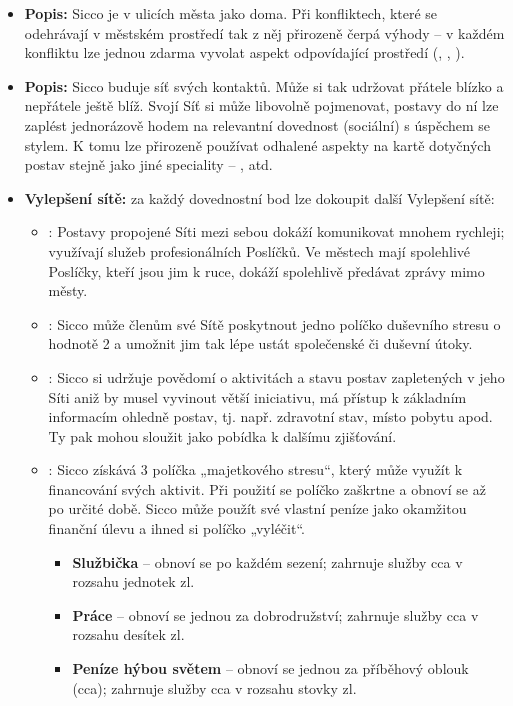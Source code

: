 \documentclass[../main.tex]{subfiles}
\begin{document}
\begin{specialita}
\begin{itemize}
	\item \textbf{Popis:} Sicco je v ulicích města jako doma. Při konfliktech, které se odehrávají v městském prostředí tak z něj přirozeně čerpá výhody – v každém konfliktu lze jednou zdarma vyvolat aspekt odpovídající prostředí (, , ).
\end{itemize}
\end{specialita}

\begin{specialita}
\begin{itemize}
	\item \textbf{Popis:} Sicco buduje síť svých kontaktů. Může si tak udržovat přátele blízko a nepřátele ještě blíž. Svojí Síť si může libovolně pojmenovat, postavy do ní lze zaplést jednorázově hodem na relevantní dovednost (sociální) s úspěchem se stylem. K tomu lze přirozeně používat odhalené aspekty na kartě dotyčných postav stejně jako jiné speciality – ,  atd.
	\item \textbf{Vylepšení sítě:} za každý dovednostní bod lze dokoupit další Vylepšení sítě:
		\begin{itemize}
			\item {}: Postavy propojené Síti mezi sebou dokáží komunikovat mnohem rychleji; využívají služeb profesionálních Poslíčků. Ve městech mají spolehlivé Poslíčky, kteří jsou jim k ruce, dokáží spolehlivě předávat zprávy mimo městy.
			\item {}: Sicco může členům své Sítě poskytnout jedno políčko duševního stresu o hodnotě 2 a umožnit jim tak lépe ustát společenské či duševní útoky.
			\item {}: Sicco si udržuje povědomí o aktivitách a stavu postav zapletených v jeho Síti aniž by musel vyvinout větší iniciativu, má přístup k základním informacím ohledně postav, tj. např. zdravotní stav, místo pobytu apod. Ty pak mohou sloužit jako pobídka k dalšímu zjišťování.
			\item {}: Sicco získává 3 políčka „majetkového stresu“, který může využít k financování svých aktivit. Při použití se políčko zaškrtne a obnoví se až po určité době. Sicco může použít své vlastní peníze jako okamžitou finanční úlevu a ihned si políčko „vyléčit“.
				\begin{itemize}
					\item \textbf{Službička} – obnoví se po každém sezení; zahrnuje služby cca v rozsahu jednotek zl.
					\item \textbf{Práce} – obnoví se jednou za dobrodružství; zahrnuje služby cca v rozsahu desítek zl.
					\item \textbf{Peníze hýbou světem} – obnoví se jednou za příběhový oblouk (cca); zahrnuje služby cca v rozsahu stovky zl.
				\end{itemize}
		\end{itemize}
\end{itemize}
\end{specialita}
\end{document}
